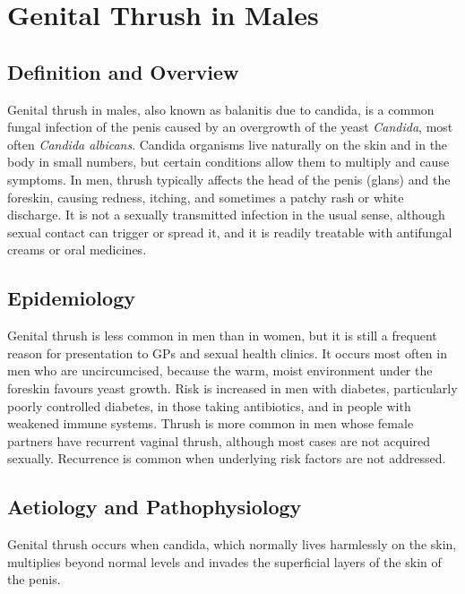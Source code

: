 \chapter{Genital Thrush in Males}

\section*{Definition and Overview}
Genital thrush in males, also known as balanitis due to candida, is a common fungal infection of the penis caused by an overgrowth of the yeast \textit{Candida}, most often \textit{Candida albicans}. Candida organisms live naturally on the skin and in the body in small numbers, but certain conditions allow them to multiply and cause symptoms. In men, thrush typically affects the head of the penis (glans) and the foreskin, causing redness, itching, and sometimes a patchy rash or white discharge. It is not a sexually transmitted infection in the usual sense, although sexual contact can trigger or spread it, and it is readily treatable with antifungal creams or oral medicines.

\section*{Epidemiology}
Genital thrush is less common in men than in women, but it is still a frequent reason for presentation to GPs and sexual health clinics. It occurs most often in men who are uncircumcised, because the warm, moist environment under the foreskin favours yeast growth. Risk is increased in men with diabetes, particularly poorly controlled diabetes, in those taking antibiotics, and in people with weakened immune systems. Thrush is more common in men whose female partners have recurrent vaginal thrush, although most cases are not acquired sexually. Recurrence is common when underlying risk factors are not addressed.

\section*{Aetiology and Pathophysiology}
Genital thrush occurs when candida, which normally lives harmlessly on the skin, multiplies beyond normal levels and invades the superficial layers of the skin of the penis.

